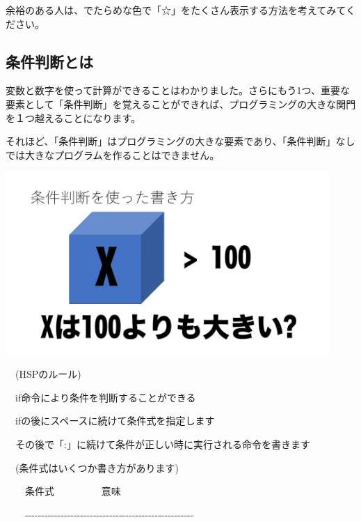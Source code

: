 \documentclass[a4paper,12pt]{jarticle}
\begin{document}
余裕のある人は、でたらめな色で「☆」をたくさん表示する方法を考えてみてください。

\bigskip
\bigskip

\subsection{条件判断とは}
\bigskip
\bigskip

変数と数字を使って計算ができることはわかりました。さらにもう1つ、重要な要素として「条件判断」を覚えることができれば、プログラミングの大きな関門を１つ越えることになります。

それほど、「条件判断」はプログラミングの大きな要素であり、「条件判断」なしでは大きなプログラムを作ることはできません。

\bigskip
\bigskip

\begin{minipage}{9.781cm}
\centering
{\upshape
\includegraphics[keepaspectratio,width=12.33cm,height=6.939cm]{text02-img/text02-img049.png}}
\end{minipage}

\bigskip
\bigskip
\bigskip

\ \ (HSPのルール)


\bigskip

\ \ if命令により条件を判断することができる

\ \ ifの後にスペースに続けて条件式を指定します

\ \ その後で「:」に続けて条件が正しい時に実行される命令を書きます


\bigskip

\ \ (条件式はいくつか書き方があります)


\bigskip

\ \ \ \ 条件式 \ \ \ \ \ \ \ \ \ 意味

\ \ \ \ {}-{}-{}-{}-{}-{}-{}-{}-{}-{}-{}-{}-{}-{}-{}-{}-{}-{}-{}-{}-{}-{}-{}-{}-{}-{}-{}-{}-{}-{}-{}-{}-{}-{}-{}-{}-{}-{}-{}-{}-{}-{}-{}-{}-{}-{}-{}-{}-{}-{}-{}-{}-
\end{document}
